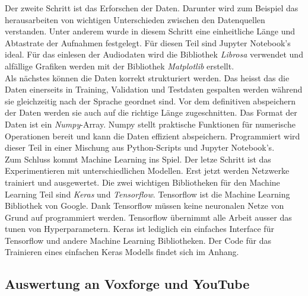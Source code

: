 Der zweite Schritt ist das Erforschen der Daten. Darunter wird zum Beispiel das herausarbeiten von wichtigen Unterschieden zwischen den Datenquellen verstanden. Unter anderem wurde in diesem Schritt eine einheitliche Länge und Abtastrate der Aufnahmen festgelegt. Für diesen Teil sind Jupyter Notebook's ideal.  Für das einlesen der Audiodaten wird die Bibliothek \textit{Librosa}\parencite{librosa} verwendet und alfällige Grafiken werden mit der Bibliothek \textit{Matplotlib}\parencite{matplotlib} erstellt.
\\
Als nächstes können die Daten korrekt strukturiert werden. Das heisst das die Daten einerseits in Training, Validation und Testdaten gespalten werden während sie gleichzeitig nach der Sprache geordnet sind. Vor dem definitiven abspeichern der Daten werden sie auch auf die richtige Länge zugeschnitten. Das Format der Daten ist ein \textit{Numpy}-Array\parencite{numpy}. Numpy stellt praktische Funktionen für numerische Operationen bereit und kann die Daten effizient abspeichern. Programmiert wird dieser Teil in einer Mischung aus Python-Scripts und Jupyter Notebook's.
\\
Zum Schluss kommt Machine Learning ins Spiel. Der letze Schritt ist das Experimentieren mit unterschiedlichen Modellen. Erst jetzt werden Netzwerke trainiert und ausgewertet. Die zwei wichtigen Bibliotheken für den Machine Learning Teil sind \textit{Keras}\parencite{keras} und \textit{Tensorflow}\parencite{tensorflow}. Tensorflow ist die Machine Learning Bibliothek von Google. Dank Tensorflow müssen keine neuronalen Netze von Grund auf programmiert werden. Tensorflow übernimmt alle Arbeit ausser das tunen von Hyperparametern. Keras ist lediglich ein einfaches Interface für Tensorflow und andere Machine Learning Bibliotheken. Der Code für das Trainieren eines einfachen Keras Modells findet sich im Anhang. 


\subsection{Auswertung an Voxforge und YouTube}


